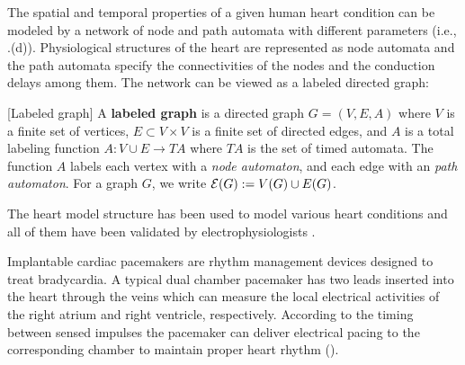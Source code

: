 %
The spatial and temporal properties of a given human heart condition can be modeled by a network of node and path automata with different parameters (i.e., .(d)). Physiological structures of the heart are represented as node automata and the path automata specify the connectivities of the nodes and the conduction delays among them. 
The network can be viewed as a labeled directed graph: %
\begin{defn}
	\label{def:labeledGraph}
	[Labeled graph]
	A \textbf{labeled graph} is a directed graph $G = (V,E,A)$ where 
	$V$ is a finite set of vertices, $E \subset V\times V$ is a finite set of directed edges,
	and $A$ is a total labeling function $A: V \cup E \rightarrow TA$
	where $TA$ is the set of timed automata.
	The function $A$ labels each vertex with a \emph{node automaton}, and each edge with an \emph{path automaton}.
	For a graph $G$, we write $\mathcal{E}(G) := V(G) \cup E(G)$.
\end{defn}
The heart model structure has been used to model various heart conditions and all of them have been validated by electrophysiologists \cite{vhm_ecrts10,vhm_embc10}.

Implantable cardiac pacemakers are rhythm management devices designed to treat bradycardia. 
A typical dual chamber pacemaker has two leads inserted into the heart through the veins which can measure the local electrical activities of the right atrium and right ventricle, respectively. According to the timing between sensed impulses the pacemaker can deliver electrical pacing to the corresponding chamber to maintain proper heart rhythm ().  



